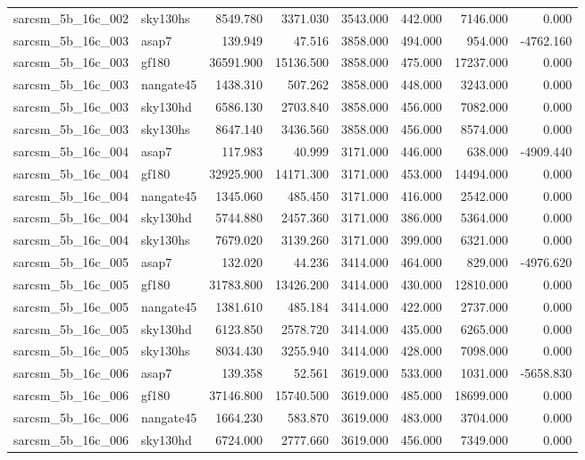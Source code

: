 \begin{tabular}{llrrrrrr}
sarcsm\_5b\_16c\_002 & sky130hs & 8549.780 & 3371.030 & 3543.000 & 442.000 & 7146.000 & 0.000 \\
sarcsm\_5b\_16c\_003 & asap7 & 139.949 & 47.516 & 3858.000 & 494.000 & 954.000 & -4762.160 \\
sarcsm\_5b\_16c\_003 & gf180 & 36591.900 & 15136.500 & 3858.000 & 475.000 & 17237.000 & 0.000 \\
sarcsm\_5b\_16c\_003 & nangate45 & 1438.310 & 507.262 & 3858.000 & 448.000 & 3243.000 & 0.000 \\
sarcsm\_5b\_16c\_003 & sky130hd & 6586.130 & 2703.840 & 3858.000 & 456.000 & 7082.000 & 0.000 \\
sarcsm\_5b\_16c\_003 & sky130hs & 8647.140 & 3436.560 & 3858.000 & 456.000 & 8574.000 & 0.000 \\
sarcsm\_5b\_16c\_004 & asap7 & 117.983 & 40.999 & 3171.000 & 446.000 & 638.000 & -4909.440 \\
sarcsm\_5b\_16c\_004 & gf180 & 32925.900 & 14171.300 & 3171.000 & 453.000 & 14494.000 & 0.000 \\
sarcsm\_5b\_16c\_004 & nangate45 & 1345.060 & 485.450 & 3171.000 & 416.000 & 2542.000 & 0.000 \\
sarcsm\_5b\_16c\_004 & sky130hd & 5744.880 & 2457.360 & 3171.000 & 386.000 & 5364.000 & 0.000 \\
sarcsm\_5b\_16c\_004 & sky130hs & 7679.020 & 3139.260 & 3171.000 & 399.000 & 6321.000 & 0.000 \\
sarcsm\_5b\_16c\_005 & asap7 & 132.020 & 44.236 & 3414.000 & 464.000 & 829.000 & -4976.620 \\
sarcsm\_5b\_16c\_005 & gf180 & 31783.800 & 13426.200 & 3414.000 & 430.000 & 12810.000 & 0.000 \\
sarcsm\_5b\_16c\_005 & nangate45 & 1381.610 & 485.184 & 3414.000 & 422.000 & 2737.000 & 0.000 \\
sarcsm\_5b\_16c\_005 & sky130hd & 6123.850 & 2578.720 & 3414.000 & 435.000 & 6265.000 & 0.000 \\
sarcsm\_5b\_16c\_005 & sky130hs & 8034.430 & 3255.940 & 3414.000 & 428.000 & 7098.000 & 0.000 \\
sarcsm\_5b\_16c\_006 & asap7 & 139.358 & 52.561 & 3619.000 & 533.000 & 1031.000 & -5658.830 \\
sarcsm\_5b\_16c\_006 & gf180 & 37146.800 & 15740.500 & 3619.000 & 485.000 & 18699.000 & 0.000 \\
sarcsm\_5b\_16c\_006 & nangate45 & 1664.230 & 583.870 & 3619.000 & 483.000 & 3704.000 & 0.000 \\
sarcsm\_5b\_16c\_006 & sky130hd & 6724.000 & 2777.660 & 3619.000 & 456.000 & 7349.000 & 0.000 \\

\end{tabular}
